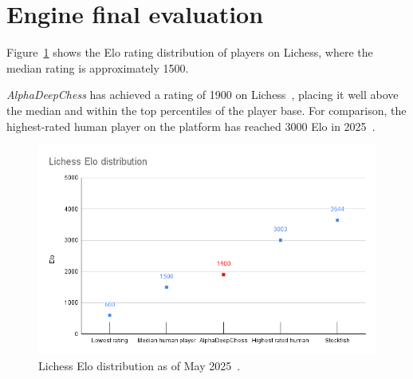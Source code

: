 \section{Engine final evaluation}

\noindent Figure~\cref{fig:eloDistribution} shows the Elo rating distribution of players on Lichess, where the median rating is approximately 1500.

\vspace{1em}

\noindent \textit{AlphaDeepChess} has achieved a rating of 1900 on Lichess~\cite{AlphaDeepChessElo}, placing it well above the median and within the top percentiles of the player base. For comparison, the highest-rated human player on the platform has reached 3000 Elo in 2025~\cite{LichessBestPlayer}.

\begin{figure}
    \centering
    \includegraphics[width=0.95\linewidth]{Imagenes/eloDistribution.png}
    \caption{Lichess Elo distribution as of May 2025~\cite{LichessEloDistribution}.}
    \label{fig:eloDistribution}
\end{figure}